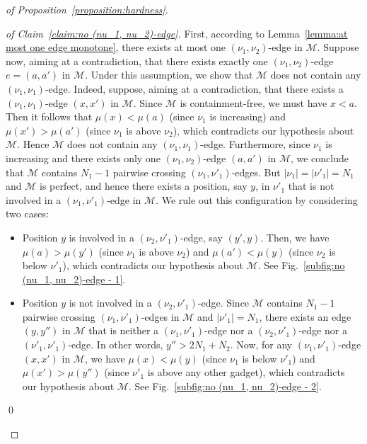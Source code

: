 \documentclass[a4paper]{llncs}
\begin{document}
\begin{proof}[of Proposition~\ref{proposition:hardness}]
  \begin{proof}[of Claim~\ref{claim:no (nu_1, nu_2)-edge}]
    First, according to Lemma~\ref{lemma:at most one edge monotone},
    there exists at most one $(\nu_1, \nu_2)$-edge in $\mathcal{M}$.
    Suppose now, aiming at a contradiction, that there exists
    exactly one $(\nu_1, \nu_2)$-edge $e = (a, a')$ in $\mathcal{M}$.
    Under this assumption, we show that $\mathcal{M}$ does not contain any $(\nu_1, \nu_1)$-edge.
    Indeed, suppose, aiming at a contradiction,
    that there exists a $(\nu_1, \nu_1)$-edge $(x, x')$ in $\mathcal{M}$.
    Since $\mathcal{M}$ is containment-free,
    we must have $x < a$.
    Then it follows that $\mu(x) < \mu(a)$ (since $\nu_1$ is increasing) and
    $\mu(x') > \mu(a')$ (since $\nu_1$ is above $\nu_2$),
    which contradicts our hypothesis about $\mathcal{M}$.
    Hence $\mathcal{M}$ does not contain any $(\nu_1, \nu_1)$-edge.
    Furthermore, since $\nu_1$ is increasing and
    there exists only one $(\nu_1, \nu_2)$-edge $(a, a')$ in $\mathcal{M}$,
    we conclude that
    $\mathcal{M}$ contains $N_1-1$ pairwise crossing $(\nu_1, \nu'_1)$-edges.
    But $|\nu_1| = |\nu'_1| = N_1$ and $\mathcal{M}$ is perfect,
    and hence there exists a position, say $y$, in $\nu'_1$ that is
    not involved in a $(\nu_1, \nu'_1)$-edge in $\mathcal{M}$.
    We rule out this configuration by considering two cases:
    \begin{itemize}
      \item Position $y$ is involved in a $(\nu_2, \nu'_1)$-edge,
      say $(y', y)$. Then, we have $\mu(a) > \mu(y')$ (since $\nu_1$ is above $\nu_2$)
      and $\mu(a') < \mu(y)$ (since $\nu_2$ is below $\nu'_1$),
      which contradicts our hypothesis about $\mathcal{M}$.
      See Fig.~\ref{subfig:no (nu_1, nu_2)-edge - 1}.
      \item Position $y$ is not involved in a $(\nu_2, \nu'_1)$-edge.
      Since $\mathcal{M}$ contains $N_1-1$ pairwise crossing $(\nu_1, \nu'_1)$-edges
      in $\mathcal{M}$ and $|\nu'_1| = N_1$, there exists an edge $(y, y'')$ in $\mathcal{M}$
      that is neither a $(\nu_1, \nu'_1)$-edge nor a $(\nu_2, \nu'_1)$-edge
      nor a $(\nu'_1, \nu'_1)$-edge.
      In other words, $y'' > 2N_1 + N_2$.
      Now, for any $(\nu_1, \nu'_1)$-edge $(x, x')$ in $\mathcal{M}$, we
      have $\mu(x) < \mu(y)$ (since $\nu_1$ is below $\nu'_1$)
      and $\mu(x') > \mu(y'')$ (since $\nu'_1$ is above any other gadget),
      which contradicts our hypothesis about $\mathcal{M}$.
      See Fig.~\ref{subfig:no (nu_1, nu_2)-edge - 2}.
    \end{itemize}
    \qed
  \end{proof}


\end{proof}
\end{document}
